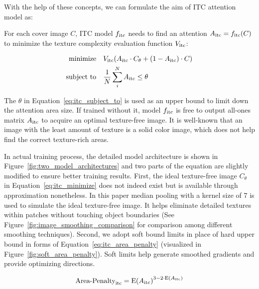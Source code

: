 With the help of these concepts, we can formulate the aim of ITC attention model as:

For each cover image \(C\), ITC model \(f_{\text{itc}}\) needs to find an attention \(A_{\text{itc}} = f_{\text{itc}}(C)\) to minimize the texture complexity evaluation function \(V_{\text{itc}}\):

\begin{align}
  \text{minimize}   \quad & V_{\text{itc}}(A_{\text{itc}} \cdot C_{\theta} + (1 - A_{\text{itc}}) \cdot C)
  \label{eq:itc_minimize}                                                                         \\
  \text{subject to} \quad & \frac{1}{N} \sum_{i}^{N} A_{\text{itc}} \leq \theta \label{eq:itc_subject_to}
\end{align}

The \( \theta \) in Equation~\ref{eq:itc_subject_to} is used as an upper bound to limit down the attention area size. If trained without it, model \(f_{\text{itc}}\) is free to output all-ones matrix \(A_{\text{itc}}\) to acquire an optimal texture-free image. It is well-known that an image with the least amount of texture is a solid color image, which does not help find the correct texture-rich areas.

In actual training process, the detailed model architecture is shown in Figure~\ref{fig:two_model_architectures} and two parts of the equation are slightly modified to ensure better training results. First, the ideal texture-free image \(C_{\theta}\) in Equation~\ref{eq:itc_minimize} does not indeed exist but is available through approximation nonetheless. In this paper median pooling with a kernel size of 7 is used to simulate the ideal texture-free image. It helps eliminate detailed textures within patches without touching object boundaries (See Figure~\ref{fig:image_smoothing_comparison} for comparison among different smoothing techniques). Second, we adopt soft bound limits in place of hard upper bound in forms of Equation~\ref{eq:itc_area_penalty} (visualized in Figure~\ref{fig:soft_area_penalty}). Soft limits help generate smoothed gradients and provide optimizing directions.

\figureImageSmoothingComparison%

\begin{equation}
  \text{Area-Penalty}_{\text{itc}} = {\mathrm{E}(A_{\text{itc}})}^{3-2 \cdot \mathrm{E}(A_{\text{itc}})}
  \label{eq:itc_area_penalty}
\end{equation}

\figureItcAttentionEffect%

